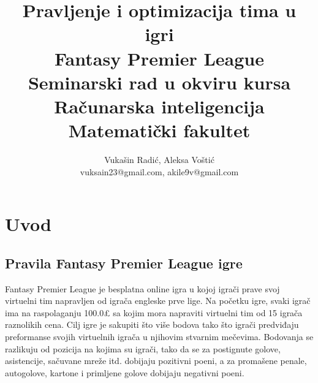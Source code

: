 \documentclass[a4paper]{article}
\begin{document}
\title{Pravljenje i optimizacija tima u igri \\
Fantasy Premier League \\ 
\vspace{2mm} \small {Seminarski rad u okviru kursa\\Računarska inteligencija\\ Matematički fakultet}}

\author{Vukašin Radić, Aleksa Voštić\\ vuksain23@gmail.com, akile9v@gmail.com}



\maketitle



\tableofcontents

\newpage




\section{Uvod}
\label{sec:uvod}


\subsection{Pravila Fantasy Premier League igre}
\vspace{3mm}
\label{sec:pravila}
Fantasy Premier League je besplatna online igra u kojoj igrači prave svoj virtuelni tim napravljen od igrača engleske prve lige. Na početku igre, svaki igrač ima na raspolaganju 100.0£ sa kojim mora napraviti virtuelni tim od 15 igrača raznolikih cena. Cilj igre je sakupiti što više bodova tako što igrači predviđaju preformanse svojih virtuelnih igrača u njihovim stvarnim mečevima. Bodovanja se razlikuju od pozicija na kojima su igrači, tako da se za postignute golove, asistencije, sačuvane mreže itd. dobijaju pozitivni poeni, a za promašene penale, autogolove, kartone i primljene golove dobijaju negativni poeni. \\
\end{document}
